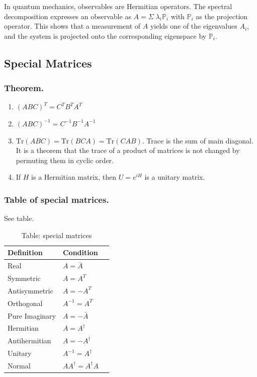 \documentclass[../../../main.tex]{subfiles}
\begin{document}
In quantum mechanics, observables are Hermitian operators.
The spectral decomposition expresses an observable as $	A = \Sigma\; \lambda_{i}\mathbb{P}_{i}$ with $\mathbb{P}_i$ as the projection operator.
This shows that a measurement of $A$ yields one of the eigenvalues $A_i$, and the system is projected onto the corresponding eigenspace by $\mathbb{P}_i$.

\subsection{Special Matrices}
\subsubsection{Theorem.}
\begin{enumerate}
	\item $(ABC)^T=C^TB^TA^T$
	\item $(ABC)^{-1}=C^{-1}B^{-1}A^{-1}$
	\item $\mathrm{Tr}(ABC)=\mathrm{Tr}(BCA)=\mathrm{Tr}(CAB)$.  Trace is the sum of main diagonal. It is a theorem that the
	      trace of a product of matrices is not changed by permuting them in cyclic order.
	\item If $H$ is a Hermitian matrix, then $U = e^{iH}$ is a unitary matrix.
\end{enumerate}

\subsubsection{Table of special matrices.} See table.

\begin{table}[h]
	\centering
	\begin{tabular}{@{}llr@{}}
		\toprule
		Definition     & Condition                   \\
		\midrule
		Real           & $A=\bar{A}$                 \\
		Symmetric      & $A=A^T$                     \\
		Antisymmetric  & $A=-A^T$                    \\
		Orthogonal     & $A^{-1}=A^T$                \\
		Pure Imaginary & $A=-\bar{A}$                \\
		Hermitian      & $A=A^{\dagger}$             \\
		Antihermitian  & $A=-A^{\dagger}$            \\
		Unitary        & $A^{-1}=A^{\dagger}$        \\
		Normal         & $AA^{\dagger}=A^{\dagger}A$ \\
		\bottomrule
	\end{tabular}
	\caption*{Table: special matrices}
\end{table}
\end{document}
